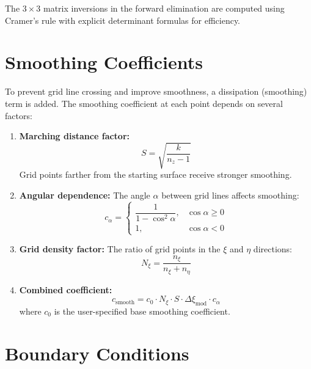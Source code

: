 \documentclass[11pt,a4paper]{report}
\begin{document}
The $3 \times 3$ matrix inversions in the forward elimination are computed using Cramer's rule with explicit determinant formulas for efficiency.

\section{Smoothing Coefficients}

To prevent grid line crossing and improve smoothness, a dissipation (smoothing) term is added. The smoothing coefficient at each point depends on several factors:

\begin{enumerate}
    \item \textbf{Marching distance factor:}
    \begin{equation}
        S = \sqrt{\frac{k}{n_z - 1}}
    \end{equation}
    Grid points farther from the starting surface receive stronger smoothing.

    \item \textbf{Angular dependence:} The angle $\alpha$ between grid lines affects smoothing:
    \begin{equation}
        c_\alpha = \begin{cases}
            \dfrac{1}{1 - \cos^2\alpha}, & \cos\alpha \geq 0 \\
            1, & \cos\alpha < 0
        \end{cases}
    \end{equation}

    \item \textbf{Grid density factor:} The ratio of grid points in the $\xi$ and $\eta$ directions:
    \begin{equation}
        N_\xi = \frac{n_\xi}{n_\xi + n_\eta}
    \end{equation}

    \item \textbf{Combined coefficient:}
    \begin{equation}
        c_{\text{smooth}} = c_0 \cdot N_\xi \cdot S \cdot \Delta\xi_{\text{mod}} \cdot c_\alpha
    \end{equation}
    where $c_0$ is the user-specified base smoothing coefficient.
\end{enumerate}

\section{Boundary Conditions}
\end{document}
